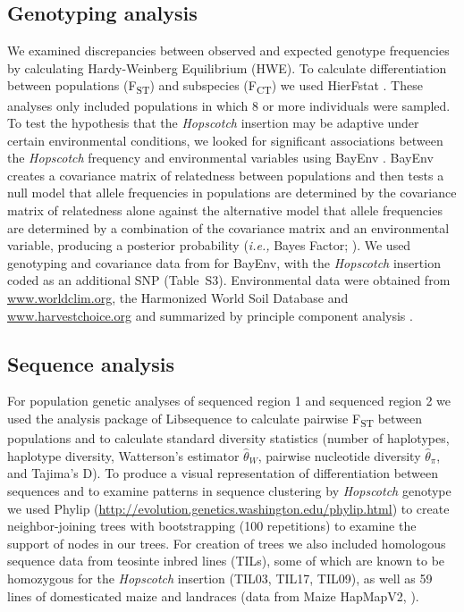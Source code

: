 \documentclass[11pt]{article}
\begin{document}
\begin{linenumbers}
\begin{flushleft}
\subsection*{Genotyping analysis}

We examined discrepancies between observed and expected genotype frequencies by calculating Hardy-Weinberg Equilibrium (HWE).  To calculate differentiation between populations (F\textsubscript{ST}) and subspecies (F\textsubscript{CT}) we used HierFstat \citep{Goudet2005}. These analyses only included populations in which 8 or more individuals were sampled. To test the hypothesis that the \emph{Hopscotch} insertion may be adaptive under certain environmental conditions, we looked for significant associations between the \emph{Hopscotch} frequency and environmental variables using BayEnv \citep{Coop2010}. BayEnv creates a covariance matrix of relatedness between populations and then tests a null model that allele frequencies in populations are determined by the covariance matrix of relatedness alone against the alternative model that allele frequencies are determined by a combination of the covariance matrix and an environmental variable, producing a posterior probability (\emph{i.e.,} Bayes Factor; \citealt{Coop2010}). We used genotyping and covariance data from \citet{Pyhajarvi2013} for BayEnv, with the \emph{Hopscotch} insertion coded as an additional SNP (Table~S3). Environmental data were obtained from \url{www.worldclim.org}, the Harmonized World Soil Database \citep{FAOHWSD} and \url{www.harvestchoice.org} and summarized by principle component analysis \citep{Pyhajarvi2013}.

\subsection*{Sequence analysis}

For population genetic analyses of sequenced region 1 and sequenced region 2 we used the analysis package of Libsequence \citep{Thornton2003} to calculate pairwise F\textsubscript{ST} between populations and to calculate standard diversity statistics (number of haplotypes, haplotype diversity, Watterson's estimator $\hat\theta_W$, pairwise nucleotide diversity $\hat\theta_\pi$, and Tajima's D). To produce a visual representation of differentiation between sequences and to examine patterns in sequence clustering by \emph{Hopscotch} genotype we used Phylip (\url{http://evolution.genetics.washington.edu/phylip.html}) to create neighbor-joining trees with bootstrapping (100 repetitions) to examine the support of nodes in our trees. For creation of trees we also included homologous sequence data from teosinte inbred lines (TILs), some of which are known to be homozygous for the \emph{Hopscotch} insertion (TIL03, TIL17, TIL09), as well as 59 lines of domesticated maize and landraces (data from Maize HapMapV2, \citealt{Chia2012}).



\end{flushleft}
\end{linenumbers}
\end{document}
